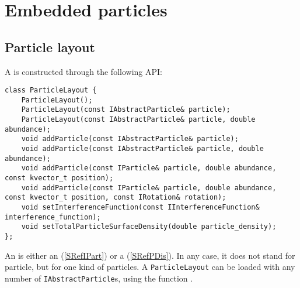 
\chapter{Embedded particles}\label{SRefParticles}

\section{Particle layout}\label{SRefPLay}

A  is constructed through the following API:

\setCpp
\begin{lstlisting}
class ParticleLayout {
    ParticleLayout();
    ParticleLayout(const IAbstractParticle& particle);
    ParticleLayout(const IAbstractParticle& particle, double abundance);
    void addParticle(const IAbstractParticle& particle);
    void addParticle(const IAbstractParticle& particle, double abundance);
    void addParticle(const IParticle& particle, double abundance, const kvector_t position);
    void addParticle(const IParticle& particle, double abundance, const kvector_t position, const IRotation& rotation);
    void setInterferenceFunction(const IInterferenceFunction& interference_function);
    void setTotalParticleSurfaceDensity(double particle_density);
};
\end{lstlisting}

An  is either an  (\cref{SRefIPart})
or a  (\cref{SRefPDis}).
%
%
%
In any case, it does not stand for  particle,
but for one kind of particles.
A \texttt{ParticleLayout} can be loaded with any number of \texttt{IAbstractParticle}s,
using the function .

